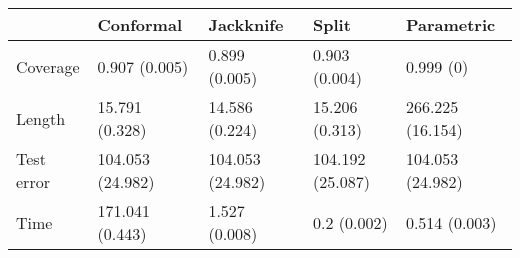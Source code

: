 \begin{tabular}{|l|l|l|l|l|}
\hline
& Conformal & Jackknife & Split & Parametric \\
\hline
Coverage & 0.907 (0.005) & 0.899 (0.005) & 0.903 (0.004) & 0.999 (0) \\
\hline
Length & 15.791 (0.328) & 14.586 (0.224) & 15.206 (0.313) & 266.225 (16.154) \\
\hline
Test error & 104.053 (24.982) & 104.053 (24.982) & 104.192 (25.087) & 104.053 (24.982) \\
\hline
Time & 171.041 (0.443) & 1.527 (0.008) & 0.2 (0.002) & 0.514 (0.003) \\
\hline
\end{tabular}
